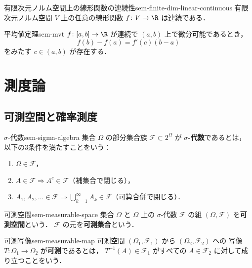 \begin{proposition}{有限次元ノルム空間上の線形関数の連続性}{sem-finite-dim-linear-continuous}
  有限次元ノルム空間 $V$ 上の任意の線形関数 $f \colon V \to \R$ は連続である．
\end{proposition}

\begin{theorem}{平均値定理}{sem-mvt}
  $f \colon [a, b] \to \R$ が連続で $(a, b)$ 上で微分可能であるとき，
  \[
    f(b) - f(a) = f'(c)(b - a)
  \]
  をみたす $c \in (a, b)$ が存在する．
\end{theorem}

\section{測度論}
\label{sec:sem-measure-theory}

\subsection{可測空間と確率測度}
\label{sec:sem-measurable}

\begin{definition}{$\sigma$-代数}{sem-sigma-algebra}
  集合 $\Omega$ の部分集合族 $\mathcal{F} \subset 2^{\Omega}$ が
  \textbf{$\sigma$-代数}であるとは，
  以下の3条件を満たすことをいう：
  \begin{enumerate}
    \item[(i)] $\Omega \in \mathcal{F}$，
    \item[(ii)] $A \in \mathcal{F} \Longrightarrow A^c \in \mathcal{F}$（補集合で閉じる），
    \item[(iii)] $A_1, A_2, \ldots \in \mathcal{F} \Longrightarrow
      \bigcup_{k=1}^{\infty} A_k \in \mathcal{F}$（可算合併で閉じる）．
  \end{enumerate}
\end{definition}

\begin{definition}{可測空間}{sem-measurable-space}
  集合 $\Omega$ と $\Omega$ 上の $\sigma$-代数 $\mathcal{F}$ の組
  $(\Omega, \mathcal{F})$ を\textbf{可測空間}という．
  $\mathcal{F}$ の元を\textbf{可測集合}という．
\end{definition}

\begin{definition}{可測写像}{sem-measurable-map}
  可測空間 $(\Omega_1, \mathcal{F}_1)$ から $(\Omega_2, \mathcal{F}_2)$ への
  写像 $T \colon \Omega_1 \to \Omega_2$ が\textbf{可測}であるとは，
  $T^{-1}(A) \in \mathcal{F}_1$ がすべての $A \in \mathcal{F}_2$ に対して成り立つことをいう．
\end{definition}

